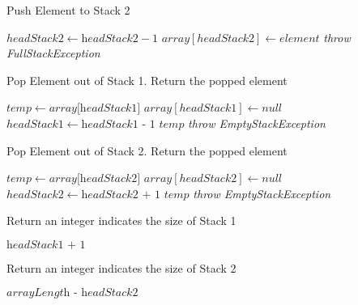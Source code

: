 \documentclass[16pt, letterpaper]{article}
\begin{document}
\begin{algorithm} [H]
\caption{Push Element to Stack 2}
\begin{algorithmic}[1]
     {}
        \State $headStack2 \gets \textit{headStack2} - 1$
        \State $array[headStack2] \gets \textit{element}$
    \Else 
        \State\textit{throw FullStackException}
    \EndIf
    \EndProcedure
\end{algorithmic}
\end{algorithm}

\begin{algorithm} [H]
\caption{Pop Element out of Stack 1. Return the popped element}
\begin{algorithmic}[1]
        \State $temp \gets \textit{array[headStack1]}$
        \State $array[headStack1] \gets \textit{null}$
        \State $headStack1 \gets \textit{headStack1 - 1}$ 
        \State \Return $temp$
    \Else
        \State \textit{throw EmptyStackException}
    \EndIf
    \EndProcedure
\end{algorithmic}
\end{algorithm}

\begin{algorithm} [H]
\caption{Pop Element out of Stack 2. Return the popped element}
\begin{algorithmic}[1]
        \State $temp \gets \textit{array[headStack2]}$
        \State $array[headStack2] \gets \textit{null}$
        \State $headStack2 \gets \textit{headStack2 + 1}$
        \State \Return $temp$
    \Else
        \State \textit{throw EmptyStackException}
    \EndIf
    \EndProcedure
\end{algorithmic}
\end{algorithm}

\begin{algorithm} [H]
\caption{Return an integer indicates the size of Stack 1}
\begin{algorithmic}
    \State \Return $\textit{headStack1 + 1}$
    \EndProcedure
\end{algorithmic}
\end{algorithm}

\begin{algorithm} [H]
\caption{Return an integer indicates the size of Stack 2}
\begin{algorithmic}
    \State \Return $\textit{arrayLength - headStack2}$
    \EndProcedure
\end{algorithmic}
\end{algorithm}
\end{document}
